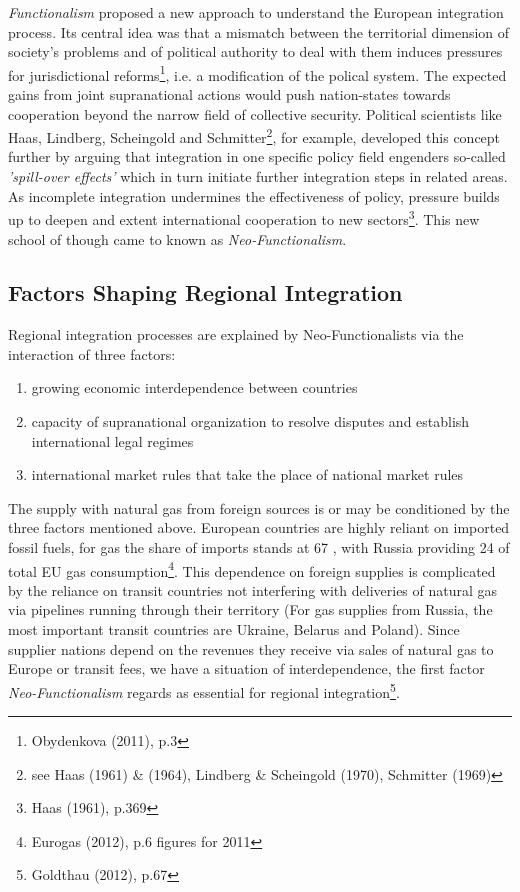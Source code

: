 \documentclass[11pt,a4paper,english]{scrreprt}
\begin{document}
\emph{Functionalism} proposed a new approach to understand the European
integration process. Its central idea was that a mismatch between the
territorial dimension of society's problems and of political authority to deal
with them induces pressures for jurisdictional reforms\footnote{Obydenkova
(2011), p.3}, i.e. a modification of the polical system. The expected gains from
joint supranational actions would push nation-states towards cooperation beyond
the narrow field of collective security. Political scientists like Haas,
Lindberg, Scheingold and Schmitter\footnote{see Haas (1961) \& (1964), Lindberg
\& Scheingold (1970), Schmitter (1969)}, for example, developed this concept
further by arguing that integration in one specific policy field engenders
so-called \emph{'spill-over effects'} which in turn initiate further integration
steps in related areas. As incomplete integration undermines the effectiveness
of policy, pressure builds up to deepen and extent international cooperation to
new sectors\footnote{Haas (1961), p.369}. This new school of though came to
known as \emph{Neo-Functionalism}.\par

\pagebreak 

	\subsection{Factors Shaping Regional Integration}

Regional integration processes are explained by Neo-Functionalists via the
interaction of three factors: 
  
  \textcolor{dunkelgrau.80}{
  \begin{enumerate}
     \item growing economic interdependence between countries
     \item capacity of supranational organization to resolve disputes and
establish international legal regimes
     \item international market rules that take the place of national market
rules
    \end{enumerate}
    }

\vspace{0.8cm}

The supply with natural gas from foreign sources is or may be conditioned
by the three factors mentioned above. European countries are highly reliant
on imported fossil fuels, for gas the share of imports stands at 67
\textdiscount{}, with Russia providing 24 \textdiscount{} of total EU gas
consumption\footnote{Eurogas (2012), p.6 \texttwelveudash{} figures for
2011}. This dependence on foreign supplies is complicated by the reliance on
transit countries not interfering with deliveries of natural gas via pipelines
running through their territory (For gas supplies from Russia, the most
important transit countries are Ukraine, Belarus and Poland). Since supplier
nations depend on the revenues they receive via sales of natural gas to Europe
or transit fees, we have a situation of interdependence, the first factor
\emph{Neo-Functionalism} regards as essential for regional
integration\footnote{Goldthau (2012), p.67}.\par
\end{document}

